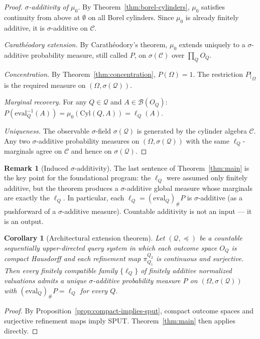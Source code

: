 \documentclass[11pt]{article}
\newtheorem{corollary}{Corollary}
\theoremstyle{definition}
\newtheorem{remark}{Remark}
\newcommand{\Qcal}{\mathcal{Q}}
\newcommand{\Bcal}{\mathcal{B}}
\newcommand{\Ccal}{\mathcal{C}}
\begin{document}
\begin{proof}
\emph{$\sigma$-additivity of $\mu_0$.}
By Theorem~\ref{thm:borel-cylinders}, $\mu_0$ satisfies continuity
from above at $\emptyset$ on all Borel cylinders.  Since $\mu_0$ is
already finitely additive, it is $\sigma$-additive on $\Ccal$.

\emph{Carath\'eodory extension.}
By Carath\'eodory's theorem, $\mu_0$ extends uniquely to a
$\sigma$-additive probability measure, still called $P$, on
$\sigma(\Ccal)$ over $\prod_Q O_Q$.

\emph{Concentration.}
By Theorem~\ref{thm:concentration}, $P(\Omega) = 1$.  The
restriction $P|_\Omega$ is the required measure on
$(\Omega, \sigma(\Qcal))$.

\emph{Marginal recovery.}
For any $Q \in \Qcal$ and $A \in \Bcal(O_Q)$:
$P(\mathrm{eval}_Q^{-1}(A)) = \mu_0(\mathrm{Cyl}(Q,A)) = \ell_Q(A)$.

\emph{Uniqueness.}
The observable $\sigma$-field $\sigma(\Qcal)$ is generated by the
cylinder algebra $\Ccal$.  Any two $\sigma$-additive probability
measures on $(\Omega, \sigma(\Qcal))$ with the same $\ell_Q$-marginals
agree on $\Ccal$ and hence on $\sigma(\Qcal)$.
\end{proof}

\begin{remark}[Induced $\sigma$-additivity]
The last sentence of Theorem~\ref{thm:main} is the key point for
the foundational program: the $\ell_Q$ were assumed only finitely
additive, but the theorem produces a $\sigma$-additive global
measure whose marginals are exactly the $\ell_Q$.  In particular,
each $\ell_Q = (\mathrm{eval}_Q)_\# P$ is $\sigma$-additive (as
a pushforward of a $\sigma$-additive measure).  Countable additivity
is not an input --- it is an output.
\end{remark}

\begin{corollary}[Architectural extension theorem]
\label{cor:architectural}
Let $(\Qcal, \preceq)$ be a countable sequentially upper-directed
query system in which each outcome space $O_Q$ is compact Hausdorff
and each refinement map $\pi^{Q_2}_{Q_1}$ is continuous and
surjective.  Then every finitely compatible family $\{\ell_Q\}$ of
finitely additive normalized valuations admits a unique
$\sigma$-additive probability measure $P$ on $(\Omega,\sigma(\Qcal))$
with $(\mathrm{eval}_Q)_\# P = \ell_Q$ for every $Q$.
\end{corollary}

\begin{proof}
By Proposition~\ref{prop:compact-implies-sput}, compact outcome
spaces and surjective refinement maps imply SPUT.
Theorem~\ref{thm:main} then applies directly.
\end{proof}
\end{document}

